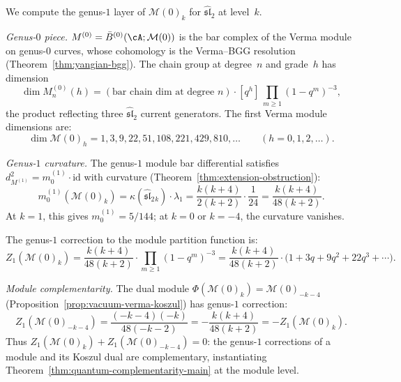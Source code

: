 \begin{example}
\label{ex:verma-genus-graded}
We compute the genus-$1$ layer of $\mathcal{M}(0)_k$ for $\widehat{\mathfrak{sl}}_2$ at level~$k$.

\emph{Genus-$0$ piece.}
$M^{(0)} = \bar{B}^{(0)}(\cA; \mathcal{M}(0))$
is the bar complex of the Verma module on genus-$0$ curves, whose
cohomology is the Verma--BGG resolution
(Theorem~\ref{thm:yangian-bgg}).  The chain group
at degree~$n$ and grade~$h$ has dimension
\[
\dim M^{(0)}_n(h) = (\text{bar chain dim at degree } n)
\cdot [q^h]\,\prod_{m \geq 1}(1-q^m)^{-3},
\]
the product reflecting three $\widehat{\mathfrak{sl}}_2$
current generators.  The first Verma module dimensions are:
\begin{equation}\label{eq:verma-dims-sl2}
\dim \mathcal{M}(0)_h = 1, 3, 9, 22, 51, 108, 221, 429, 810,
\ldots \qquad (h = 0, 1, 2, \ldots).
\end{equation}

\emph{Genus-$1$ curvature.}
The genus-$1$ module bar differential satisfies
$d_{M^{(1)}}^2 = m_0^{(1)} \cdot \mathrm{id}$
with curvature (Theorem~\ref{thm:extension-obstruction}):
\begin{equation}\label{eq:verma-genus1-curvature}
m_0^{(1)}(\mathcal{M}(0)_k)
= \kappa(\widehat{\mathfrak{sl}}_2{}_k) \cdot \lambda_1
= \frac{k(k+4)}{2(k+2)} \cdot \frac{1}{24}
= \frac{k(k+4)}{48(k+2)}.
\end{equation}
At $k = 1$, this gives $m_0^{(1)} = 5/144$;
at $k = 0$ or $k = -4$, the curvature vanishes.

The genus-$1$ correction to the module partition function is:
\begin{equation}\label{eq:verma-genus1-correction}
Z_1(\mathcal{M}(0)_k)
= \frac{k(k+4)}{48(k+2)}
\cdot \prod_{m \geq 1}(1-q^m)^{-3}
= \frac{k(k+4)}{48(k+2)}
\cdot \bigl(1 + 3q + 9q^2 + 22q^3 + \cdots\bigr).
\end{equation}

\emph{Module complementarity.}
The dual module $\Phi(\mathcal{M}(0)_k) = \mathcal{M}(0)_{-k-4}$
(Proposition~\ref{prop:vacuum-verma-koszul}) has genus-$1$
correction:
\[
Z_1(\mathcal{M}(0)_{-k-4})
= \frac{(-k-4)(-k)}{48(-k-2)}
= -\frac{k(k+4)}{48(k+2)}
= -Z_1(\mathcal{M}(0)_k).
\]
Thus $Z_1(\mathcal{M}(0)_k) + Z_1(\mathcal{M}(0)_{-k-4}) = 0$:
the genus-$1$ corrections of a module and its Koszul dual are
complementary, instantiating Theorem~\ref{thm:quantum-complementarity-main}
at the module level.


\end{example}
